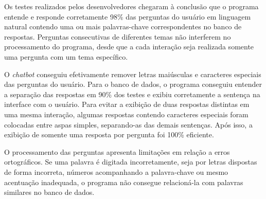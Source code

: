 \documentclass[12pt]{article}
\begin{document}
Os testes realizados pelos desenvolvedores chegaram à conclusão que o programa entende e responde corretamente 98\% das perguntas do usuário em linguagem natural contendo uma ou mais palavras-chave correspondentes no banco de respostas. Perguntas consecutivas de diferentes temas não interferem no processamento do programa, desde que a cada interação seja realizada somente uma pergunta com um tema específico.

O {\itshape chatbot} conseguiu efetivamente remover letras maiúsculas e caracteres especiais das perguntas do usuário. Para o banco de dados, o programa conseguiu entender a separação das respostas em 90\% dos testes e exibiu corretamente a sentença na interface com o usuário. Para evitar a exibição de duas respostas distintas em uma mesma interação, algumas respostas contendo caracteres especiais foram colocadas entre aspas simples, separando-as das demais sentenças. Após isso, a exibição de somente uma resposta por pergunta foi 100\% eficiente.

O processamento das perguntas apresenta limitações em relação a erros ortográficos. Se uma palavra é digitada incorretamente, seja por letras dispostas de forma incorreta, números acompanhando a palavra-chave ou mesmo acentuação inadequada, o programa não consegue relacioná-la com palavras similares no banco de dados.




\end{document}
